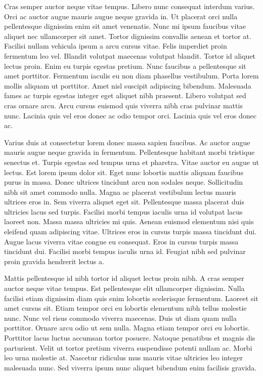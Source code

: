 \documentclass[
]{scrbook}
\begin{document}
Cras semper auctor neque vitae tempus. Libero nunc consequat interdum varius. Orci ac auctor augue mauris augue neque gravida in. Ut placerat orci nulla pellentesque dignissim enim sit amet venenatis. Nunc mi ipsum faucibus vitae aliquet nec ullamcorper sit amet. Tortor dignissim convallis aenean et tortor at. Facilisi nullam vehicula ipsum a arcu cursus vitae. Felis imperdiet proin fermentum leo vel. Blandit volutpat maecenas volutpat blandit. Tortor id aliquet lectus proin. Enim eu turpis egestas pretium. Nunc faucibus a pellentesque sit amet porttitor. Fermentum iaculis eu non diam phasellus vestibulum. Porta lorem mollis aliquam ut porttitor. Amet nisl suscipit adipiscing bibendum. Malesuada fames ac turpis egestas integer eget aliquet nibh praesent. Libero volutpat sed cras ornare arcu. Arcu cursus euismod quis viverra nibh cras pulvinar mattis nunc. Lacinia quis vel eros donec ac odio tempor orci. Lacinia quis vel eros donec ac.

Varius duis at consectetur lorem donec massa sapien faucibus. Ac auctor augue mauris augue neque gravida in fermentum. Pellentesque habitant morbi tristique senectus et. Turpis egestas sed tempus urna et pharetra. Vitae auctor eu augue ut lectus. Est lorem ipsum dolor sit. Eget nunc lobortis mattis aliquam faucibus purus in massa. Donec ultrices tincidunt arcu non sodales neque. Sollicitudin nibh sit amet commodo nulla. Magna ac placerat vestibulum lectus mauris ultrices eros in. Sem viverra aliquet eget sit. Pellentesque massa placerat duis ultricies lacus sed turpis. Facilisi morbi tempus iaculis urna id volutpat lacus laoreet non. Massa massa ultricies mi quis. Aenean euismod elementum nisi quis eleifend quam adipiscing vitae. Ultrices eros in cursus turpis massa tincidunt dui. Augue lacus viverra vitae congue eu consequat. Eros in cursus turpis massa tincidunt dui. Facilisi morbi tempus iaculis urna id. Feugiat nibh sed pulvinar proin gravida hendrerit lectus a.

Mattis pellentesque id nibh tortor id aliquet lectus proin nibh. A cras semper auctor neque vitae tempus. Est pellentesque elit ullamcorper dignissim. Nulla facilisi etiam dignissim diam quis enim lobortis scelerisque fermentum. Laoreet sit amet cursus sit. Etiam tempor orci eu lobortis elementum nibh tellus molestie nunc. Nunc vel risus commodo viverra maecenas. Duis ut diam quam nulla porttitor. Ornare arcu odio ut sem nulla. Magna etiam tempor orci eu lobortis. Porttitor lacus luctus accumsan tortor posuere. Natoque penatibus et magnis dis parturient. Velit ut tortor pretium viverra suspendisse potenti nullam ac. Morbi leo urna molestie at. Nascetur ridiculus mus mauris vitae ultricies leo integer malesuada nunc. Sed viverra ipsum nunc aliquet bibendum enim facilisis gravida.
\end{document}
